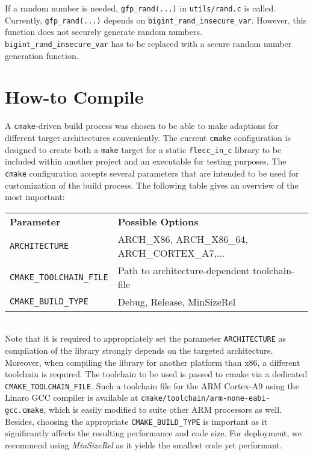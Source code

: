 \documentclass[runningheads]{llncs}
\begin{document}
If a random number is needed, \texttt{gfp\_rand(...)} in \texttt{utils/rand.c} is called. Currently, \texttt{gfp\_rand(...)} depends on \texttt{bigint\_rand\_insecure\_var}. However, this function does not securely generate random numbers. \texttt{bigint\_rand\_insecure\_var} has to be replaced with a secure random number generation function.

\section{How-to Compile}

A \texttt{cmake}-driven build process was chosen to be able to make adaptions for different target architectures conveniently. The current \texttt{cmake} configuration is designed to create both a \texttt{make} target for a static \texttt{flecc\_in\_c} library to be included within another project and an executable for testing purposes. The \texttt{cmake} configuration accepts several parameters that are intended to be used for customization of the build process. The following table gives an overview of the most important: \\

\small{
\begin{tabular}{ll}
 \textbf{Parameter} 		& \textbf{Possible Options}  \\
 \texttt{ARCHITECTURE} 		& ARCH\_X86, ARCH\_X86\_64, ARCH\_CORTEX\_A7,... \\ %
 \texttt{CMAKE\_TOOLCHAIN\_FILE} & Path to architecture-dependent toolchain-file \\ %
 \texttt{CMAKE\_BUILD\_TYPE} 	& Debug, Release, MinSizeRel \\ %
\end{tabular}
}
\\

Note that it is required to appropriately set the parameter \texttt{ARCHITECTURE} as compilation of the library strongly depends on the targeted architecture. Moreover, when compiling the library for another platform than x86, a different toolchain is required. The toolchain to be used is passed to cmake via a dedicated \texttt{CMAKE\_TOOLCHAIN\_FILE}. Such a toolchain file for the ARM Cortex-A9 using the Linaro GCC compiler is available at \texttt{cmake/toolchain/arm-none-eabi-gcc.cmake}, which is easily modified to suite other ARM processors as well. Besides, choosing the appropriate \texttt{CMAKE\_BUILD\_TYPE} is important as it significantly affects the resulting performance and code size. For deployment, we recommend using \textit{MinSizeRel} as it yields the smallest code yet performant. 
\end{document}
